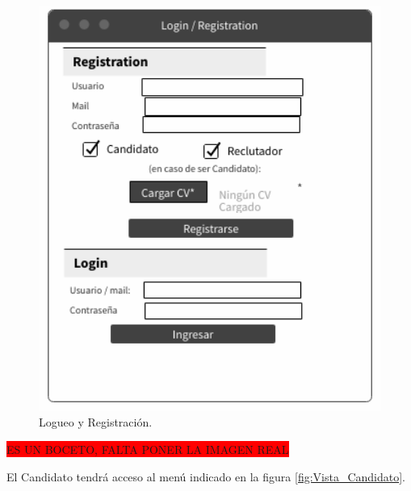 \documentclass[12pt,a4paper]{article}
\begin{document}
\begin{figure}[H]    %
  \centering
  \includegraphics[width=1\textwidth]{images/Vista_Registro.png}
  \caption{Logueo y Registración.}  
  \label{fig:Vista_Registro}
\end{figure}

\colorbox{red}{ES UN BOCETO, FALTA PONER LA IMAGEN REAL}

El Candidato tendrá acceso al menú indicado en la figura \ref{fig:Vista_Candidato}. 
\end{document}
